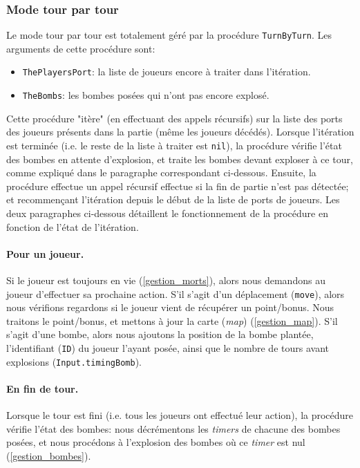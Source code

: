 \documentclass{article}
\begin{document}
\subsubsection{Mode tour par tour}
Le mode tour par tour est totalement géré par la procédure \texttt{TurnByTurn}. Les arguments de cette procédure sont:
\begin{itemize}
	\item \texttt{ThePlayersPort}: la liste de joueurs encore à traiter dans l'itération.
	\item \texttt{TheBombs}: les bombes posées qui n'ont pas encore explosé.
\end{itemize}
 Cette procédure "itère" (en effectuant des appels récursifs) sur la liste des ports des joueurs présents dans la partie (même les joueurs décédés). Lorsque l'itération est terminée (i.e. le reste de la liste à traiter est \texttt{nil}), la procédure vérifie l'état des bombes en attente d'explosion, et traite les bombes devant exploser à ce tour, comme expliqué dans le paragraphe correspondant ci-dessous. Ensuite, la procédure effectue un appel récursif effectue si la fin de partie n'est pas détectée; et recommençant l'itération depuis le début de la liste de ports de joueurs. Les deux paragraphes ci-dessous détaillent le fonctionnement de la procédure en fonction de l'état de l'itération.

\paragraph{Pour un joueur.}Si le joueur est toujours en vie (\ref{gestion_morts}), alors nous demandons au joueur d'effectuer sa prochaine action. S'il s'agit d'un déplacement (\texttt{move}), alors nous vérifions regardons si le joueur vient de récupérer un point/bonus. Nous traitons le point/bonus, et mettons à jour la carte (\emph{map}) (\ref{gestion_map}). S'il s'agit d'une bombe, alors nous ajoutons la position de la bombe plantée, l'identifiant (\texttt{ID}) du joueur l'ayant posée, ainsi que le nombre de tours avant explosions (\texttt{Input.timingBomb}).

\paragraph{En fin de tour.}Lorsque le tour est fini (i.e. tous les joueurs ont effectué leur action), la procédure vérifie l'état des bombes: nous décrémentons les \emph{timers} de chacune des bombes posées, et nous procédons à l'explosion des bombes où ce \emph{timer} est nul (\ref{gestion_bombes}).
\end{document}
